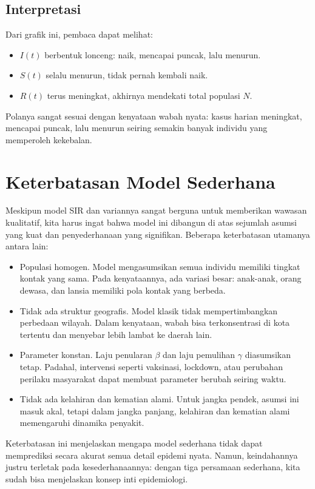 \documentclass{bukumjh}
\begin{document}
\subsection*{Interpretasi}
Dari grafik ini, pembaca dapat melihat:
\begin{itemize}
    \item $I(t)$ berbentuk lonceng: naik, mencapai puncak, lalu menurun.
    \item $S(t)$ selalu menurun, tidak pernah kembali naik.
    \item $R(t)$ terus meningkat, akhirnya mendekati total populasi $N$.
\end{itemize}
Polanya sangat sesuai dengan kenyataan wabah nyata: kasus harian meningkat, mencapai puncak, lalu menurun seiring semakin banyak individu yang memperoleh kekebalan.

\section{Keterbatasan Model Sederhana}

Meskipun model SIR dan variannya sangat berguna untuk memberikan wawasan kualitatif, kita harus ingat bahwa model ini dibangun di atas sejumlah asumsi yang kuat dan penyederhanaan yang signifikan. Beberapa keterbatasan utamanya antara lain:

\begin{itemize}
    \item {\jsg Populasi homogen.} Model mengasumsikan semua individu memiliki tingkat kontak yang sama. Pada kenyataannya, ada variasi besar: anak-anak, orang dewasa, dan lansia memiliki pola kontak yang berbeda.
    \item {\jsg Tidak ada struktur geografis.} Model klasik tidak mempertimbangkan perbedaan wilayah. Dalam kenyataan, wabah bisa terkonsentrasi di kota tertentu dan menyebar lebih lambat ke daerah lain.
    \item {\jsg Parameter konstan.} Laju penularan $\beta$ dan laju pemulihan $\gamma$ diasumsikan tetap. Padahal, intervensi seperti vaksinasi, lockdown, atau perubahan perilaku masyarakat dapat membuat parameter berubah seiring waktu.
    \item {\jsg Tidak ada kelahiran dan kematian alami.} Untuk jangka pendek, asumsi ini masuk akal, tetapi dalam jangka panjang, kelahiran dan kematian alami memengaruhi dinamika penyakit.
\end{itemize}

Keterbatasan ini menjelaskan mengapa model sederhana tidak dapat memprediksi secara akurat semua detail epidemi nyata. Namun, keindahannya justru terletak pada kesederhanaannya: dengan tiga persamaan sederhana, kita sudah bisa menjelaskan konsep inti epidemiologi.
\end{document}
